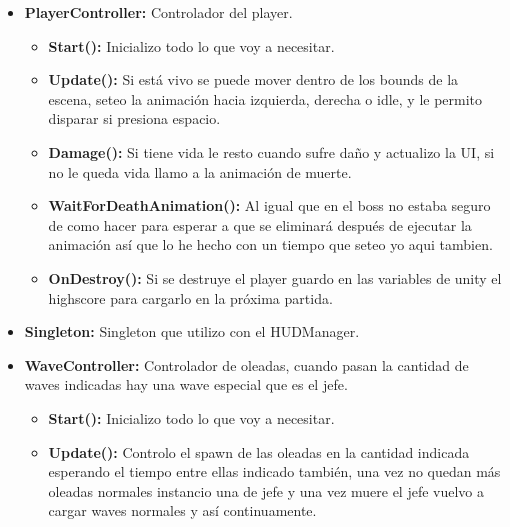 \documentclass[titlepage, 4apaper]{article}
\begin{document}
\begin{itemize}
  \item \textbf{PlayerController:} Controlador del player.
	\begin{itemize}
    \item \textbf{Start():} Inicializo todo lo que voy a necesitar.
    \item \textbf{Update():} Si está vivo se puede mover dentro de los bounds de la escena, seteo la animación hacia izquierda, derecha o idle, y le permito disparar si presiona espacio.
    \item \textbf{Damage():} Si tiene vida le resto cuando sufre daño y actualizo la UI, si no le queda vida llamo a la animación de muerte.
    \item \textbf{WaitForDeathAnimation():} Al igual que en el boss no estaba seguro de como hacer para esperar a que se eliminará después de ejecutar la animación así que lo he hecho con un tiempo que seteo yo aqui tambien.
    \item \textbf{OnDestroy():} Si se destruye el player guardo en las variables de unity el highscore para cargarlo en la próxima partida.
  \end{itemize}

  \item \textbf{Singleton:} Singleton que utilizo con el HUDManager.

  \item \textbf{WaveController:} Controlador de oleadas, cuando pasan la cantidad de waves indicadas hay una wave especial que es el jefe.
	\begin{itemize}
    \item \textbf{Start():} Inicializo todo lo que voy a necesitar.
    \item \textbf{Update():} Controlo el spawn de las oleadas en la cantidad indicada esperando el tiempo entre ellas indicado también, una vez no quedan más oleadas normales instancio una de jefe y una vez muere el jefe vuelvo a cargar waves normales y así continuamente.
  \end{itemize}

\end{itemize}
\end{document}
